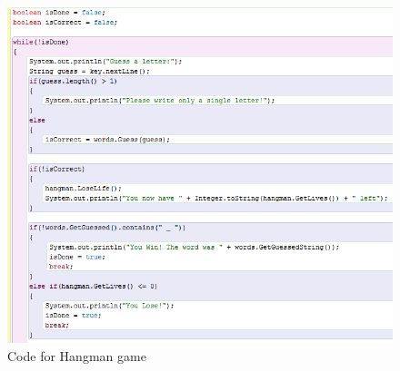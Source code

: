 \begin{figure}[!h]
  \centering
      \includegraphics[scale=0.7]{./pics/bluej_hangman_code}
      \caption{Code for Hangman game}
      \label{fig:bluej_hangman_code} 
\end{figure}


